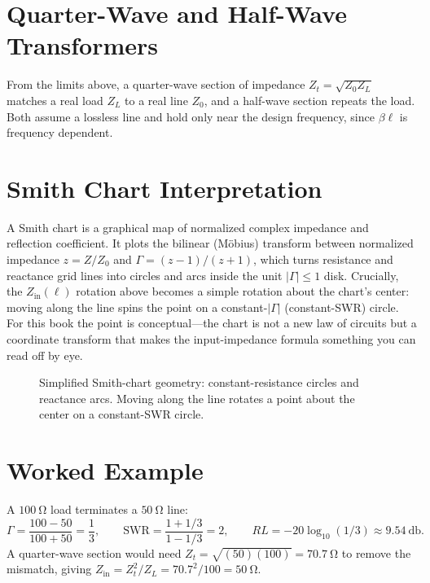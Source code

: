 \section{Quarter-Wave and Half-Wave Transformers}
From the limits above, a quarter-wave section of impedance
\(Z_t=\sqrt{Z_0Z_L}\) matches a real load \(Z_L\) to a real line \(Z_0\), and a
half-wave section repeats the load. Both assume a lossless line and hold only near
the design frequency, since \(\beta\ell\) is frequency dependent.

\section{Smith Chart Interpretation}
A Smith chart is a graphical map of normalized complex impedance and reflection
coefficient. It plots the bilinear (M\"obius) transform between normalized
impedance \(z=Z/Z_0\) and \(\Gamma=(z-1)/(z+1)\), which turns resistance and
reactance grid lines into circles and arcs inside the unit \(|\Gamma|\le1\) disk.
Crucially, the \(Z_{\mathrm{in}}(\ell)\) rotation above becomes a simple rotation
about the chart's center: moving along the line spins the point on a
constant-\(|\Gamma|\) (constant-SWR) circle. For this book the point is
conceptual---the chart is not a new law of circuits but a coordinate transform
that makes the input-impedance formula something you can read off by eye.

\begin{figure}[htbp]
\centering
{}
\caption{Simplified Smith-chart geometry: constant-resistance circles and
reactance arcs. Moving along the line rotates a point about the center on a
constant-SWR circle.}
\end{figure}

\section{Worked Example}
A \(\SI{100}{\ohm}\) load terminates a \(\SI{50}{\ohm}\) line:
\[
\Gamma=\frac{100-50}{100+50}=\frac{1}{3},
\qquad
\mathrm{SWR}=\frac{1+1/3}{1-1/3}=2,
\qquad
RL=-20\log_{10}(1/3)\approx \SI{9.54}{\decibel}.
\]
A quarter-wave section would need
\(Z_t=\sqrt{(50)(100)}=\SI{70.7}{\ohm}\) to remove the mismatch, giving
\(Z_{\mathrm{in}}=Z_t^2/Z_L=70.7^2/100=\SI{50}{\ohm}\).
